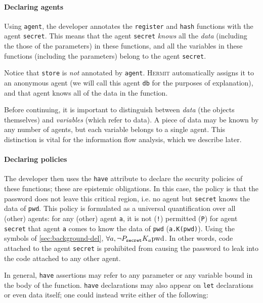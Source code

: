\documentclass[letterpaper,twocolumn,10pt]{article}
\newcommand{\Hermit}{\textsc{Hermit}}
\begin{document}
\paragraph{Declaring agents}
Using \lstinline{agent}, the developer annotates the \lstinline{register} and \lstinline{hash}
functions with the agent \lstinline{secret}. This means that the agent \lstinline{secret}
\emph{knows} all the \emph{data} (including the those of the parameters) in these functions, and all
the variables in these functions (including the parameters) belong to the agent \lstinline{secret}.

Notice that \lstinline{store} is \emph{not} annotated by \lstinline{agent}. \Hermit{} automatically
assigns it to an anonymous agent (we will call this agent \lstinline{db} for the purposes of
explanation), and that agent knows all of the data in the function.

Before continuing, it is important to distinguish between \emph{data} (the objects themselves) and
\emph{variables} (which refer to data). A piece of data may be known by any number of agents, but
each variable belongs to a single agent. This distinction is vital for the information flow
analysis, which we describe later.

\paragraph{Declaring policies}
The developer then uses the \lstinline{have} attribute to declare the security policies of these
functions; these are epistemic obligations. In this case, the policy is that the password does not
leave this critical region, i.e. no agent but \lstinline{secret} knows the data of \lstinline{pwd}.
This policy is formulated as a universal quantification over all (other) agents: for any (other)
agent \lstinline{a}, it is not (\lstinline{!}) permitted (\lstinline{P}) for agent
\lstinline{secret} that agent \lstinline{a} comes to know the data of \lstinline{pwd}
(\lstinline{a.K(pwd)}). Using the symbols of \cref{sec:background-del}, \(\forall a, \lnot
P_{\texttt{secret}} K_a \text{\lstinline{pwd}}\). In other words, code attached to the agent
\lstinline{secret} is prohibited from causing the password to leak into the code attached to any
other agent.

In general, \lstinline{have} assertions may refer to any parameter or any variable bound in the body
of the function. \lstinline{have} declarations may also appear on \lstinline{let} declarations or
even data itself; one could instead write either of the following:
\end{document}
